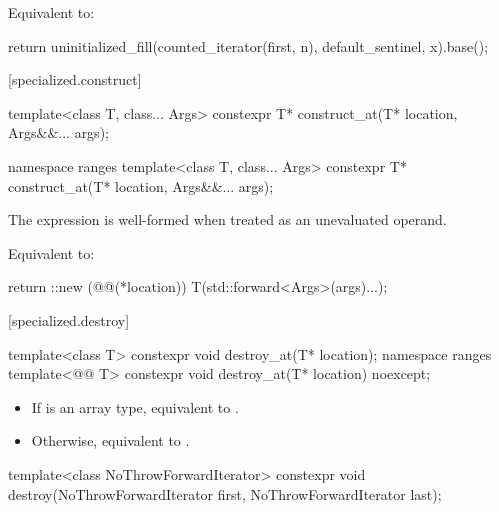 \begin{itemdescr}
\pnum
\effects
Equivalent to:
\begin{codeblock}
return uninitialized_fill(counted_iterator(first, n), default_sentinel, x).base();
\end{codeblock}
\end{itemdescr}

[specialized.construct]{}

\begin{itemdecl}
template<class T, class... Args>
  constexpr T* construct_at(T* location, Args&&... args);

namespace ranges {
  template<class T, class... Args>
    constexpr T* construct_at(T* location, Args&&... args);
}
\end{itemdecl}

\begin{itemdescr}
\pnum
\constraints
The expression 
is well-formed when treated as an unevaluated operand.

\pnum
\effects
Equivalent to:
\begin{codeblock}
return ::new (@@(*location)) T(std::forward<Args>(args)...);
\end{codeblock}
\end{itemdescr}

[specialized.destroy]{}

%
\begin{itemdecl}
template<class T>
  constexpr void destroy_at(T* location);
namespace ranges {
  template<@@ T>
    constexpr void destroy_at(T* location) noexcept;
}
\end{itemdecl}

\begin{itemdescr}
\pnum
\effects
\begin{itemize}
\item If  is an array type, equivalent to
  .
\item Otherwise, equivalent to
  .
\end{itemize}
\end{itemdescr}

%
\begin{itemdecl}
template<class NoThrowForwardIterator>
  constexpr void destroy(NoThrowForwardIterator first, NoThrowForwardIterator last);
\end{itemdecl}

